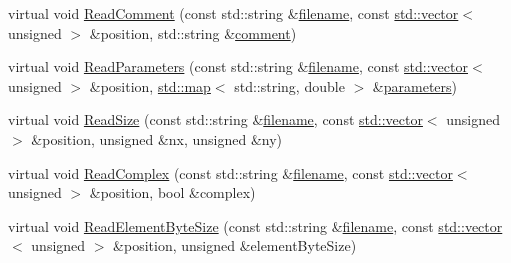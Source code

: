 \begin{DoxyCompactItemize}
\item 
virtual void \hyperlink{class_q_s_t_e_m_1_1_c_img_reader_aaf06d11f6d9c3100afeb1bc6ed7a9b6f}{Read\-Comment} (const std\-::string \&\hyperlink{write_fields2_file_8m_af3723aa817dbb65282d5e1db81f08ad8}{filename}, const \hyperlink{qmb_8m_af54b69a32590de218622e869b06b47b3}{std\-::vector}$<$ unsigned $>$ \&position, std\-::string \&\hyperlink{image_sim_8m_aea4cc4bd8e43a7f8ebf9b0ee3da8d681}{comment})
\item 
virtual void \hyperlink{class_q_s_t_e_m_1_1_c_img_reader_a54833e5ad9fcb632f8938eeaf321da0e}{Read\-Parameters} (const std\-::string \&\hyperlink{write_fields2_file_8m_af3723aa817dbb65282d5e1db81f08ad8}{filename}, const \hyperlink{qmb_8m_af54b69a32590de218622e869b06b47b3}{std\-::vector}$<$ unsigned $>$ \&position, \hyperlink{_displacement_params_8m_af619c74fd72bdb64d115463dff2720cd}{std\-::map}$<$ std\-::string, double $>$ \&\hyperlink{sim_image_from_wave_8m_acb6d7970e73c00effe1d16e23142f11d}{parameters})
\item 
virtual void \hyperlink{class_q_s_t_e_m_1_1_c_img_reader_a22293ffbcaf75170f08e8e29160cc25f}{Read\-Size} (const std\-::string \&\hyperlink{write_fields2_file_8m_af3723aa817dbb65282d5e1db81f08ad8}{filename}, const \hyperlink{qmb_8m_af54b69a32590de218622e869b06b47b3}{std\-::vector}$<$ unsigned $>$ \&position, unsigned \&nx, unsigned \&ny)
\item 
virtual void \hyperlink{class_q_s_t_e_m_1_1_c_img_reader_af0d00a9f363702a834bfe7fed526be50}{Read\-Complex} (const std\-::string \&\hyperlink{write_fields2_file_8m_af3723aa817dbb65282d5e1db81f08ad8}{filename}, const \hyperlink{qmb_8m_af54b69a32590de218622e869b06b47b3}{std\-::vector}$<$ unsigned $>$ \&position, bool \&complex)
\item 
virtual void \hyperlink{class_q_s_t_e_m_1_1_c_img_reader_ac2fb47aaa943a508038a6538f67c5c26}{Read\-Element\-Byte\-Size} (const std\-::string \&\hyperlink{write_fields2_file_8m_af3723aa817dbb65282d5e1db81f08ad8}{filename}, const \hyperlink{qmb_8m_af54b69a32590de218622e869b06b47b3}{std\-::vector}$<$ unsigned $>$ \&position, unsigned \&element\-Byte\-Size)
\end{DoxyCompactItemize}
